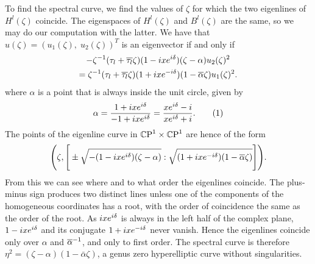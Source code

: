 \documentclass{article}
\begin{document}
To find the spectral curve, we find the values of $\zeta$ for which the two eigenlines of $H^l(\zeta)$ coincide. The eigenspaces of $H^l(\zeta)$ and $B^l(\zeta)$ are the same, so we may do our computation with the latter. We have that $u(\zeta) = (u_1(\zeta),\; u_2(\zeta))^T$ is an eigenvector if and only if
\begin{multline*}
-\zeta^{-1}(\tau_l + \overline{\tau_l}\zeta)(1 - i x e^{i \delta})(\zeta-\alpha) u_2(\zeta)^2 \\
= \zeta^{-1}(\tau_l + \overline{\tau_l}\zeta)(1+i xe^{-i \delta}) (1-\overline{\alpha}\zeta) u_1(\zeta)^2.
\end{multline*}
where $\alpha$ is a point that is always inside the unit circle, given by
\[
\alpha = \frac{1+\iu x e^{\iu \delta}}{-1+\iu x e^{\iu \delta}}
= \frac{x e^{\iu \delta} - \iu}{x e^{\iu \delta} +\iu}.
\labelthis{eqn:def branch point genus zero}
\]
The points of the eigenline curve in $\mathbb{C}\text{P}^1 \times\mathbb{C}\text{P}^1$ are hence of the form
\[
\Bigg( \zeta, \Bigg[\pm \sqrt{-(1 - i x e^{i \delta})(\zeta-\alpha)} : \sqrt{(1+i xe^{-i \delta}) (1-\overline{\alpha}\zeta)} \Bigg] \Bigg).
\]
From this we can see where and to what order the eigenlines coincide. The plus-minus sign produces two distinct lines unless one of the components of the homogeneous coordinates has a root, with the order of coincidence the same as the order of the root. As $i x e^{i \delta}$ is always in the left half of the complex plane, $1 - i x e^{i \delta}$ and its conjugate $1 + i x e^{-i \delta}$ never vanish. Hence the eigenlines coincide only over $\alpha$ and $\overline{\alpha}^{-1}$, and only to first order. The spectral curve is therefore $\eta^2 = (\zeta-\alpha)(1-\bar{\alpha}\zeta)$, a genus zero hyperelliptic curve without singularities.
\end{document}
